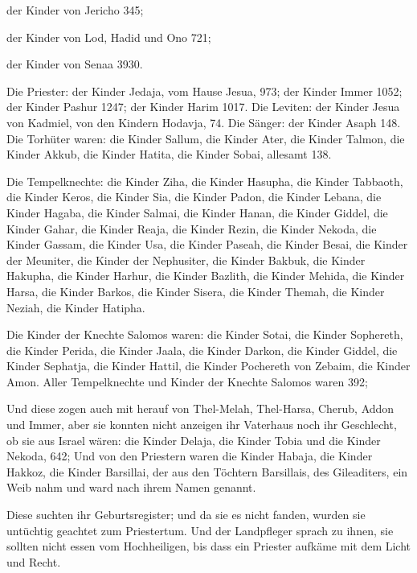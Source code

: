  der Kinder von Jericho 345;

 der Kinder von Lod, Hadid und Ono 721;

 der Kinder von Senaa 3930.

 Die Priester: der Kinder Jedaja, vom Hause Jesua, 973;
 der Kinder Immer 1052;  der Kinder Pashur
1247;  der Kinder Harim 1017.  Die
Leviten: der Kinder Jesua von Kadmiel, von den Kindern Hodavja, 74.
 Die Sänger: der Kinder Asaph 148.  Die
Torhüter waren: die Kinder Sallum, die Kinder Ater, die Kinder Talmon,
die Kinder Akkub, die Kinder Hatita, die Kinder Sobai, allesamt 138.

 Die Tempelknechte: die Kinder Ziha, die Kinder Hasupha,
die Kinder Tabbaoth,  die Kinder Keros, die Kinder Sia,
die Kinder Padon,  die Kinder Lebana, die Kinder Hagaba,
die Kinder Salmai,  die Kinder Hanan, die Kinder Giddel,
die Kinder Gahar,  die Kinder Reaja, die Kinder Rezin,
die Kinder Nekoda,  die Kinder Gassam, die Kinder Usa,
die Kinder Paseah,  die Kinder Besai, die Kinder der
Meuniter, die Kinder der Nephusiter,  die Kinder Bakbuk,
die Kinder Hakupha, die Kinder Harhur,  die Kinder
Bazlith, die Kinder Mehida, die Kinder Harsa,  die Kinder
Barkos, die Kinder Sisera, die Kinder Themah,  die Kinder
Neziah, die Kinder Hatipha.

 Die Kinder der Knechte Salomos waren: die Kinder Sotai,
die Kinder Sophereth, die Kinder Perida,  die Kinder
Jaala, die Kinder Darkon, die Kinder Giddel,  die Kinder
Sephatja, die Kinder Hattil, die Kinder Pochereth von Zebaim, die Kinder
Amon.  Aller Tempelknechte und Kinder der Knechte Salomos
waren 392;

 Und diese zogen auch mit herauf von Thel-Melah,
Thel-Harsa, Cherub, Addon und Immer, aber sie konnten nicht anzeigen ihr
Vaterhaus noch ihr Geschlecht, ob sie aus Israel wären: 
die Kinder Delaja, die Kinder Tobia und die Kinder Nekoda, 642;
 Und von den Priestern waren die Kinder Habaja, die
Kinder Hakkoz, die Kinder Barsillai, der aus den Töchtern Barsillais,
des Gileaditers, ein Weib nahm und ward nach ihrem Namen genannt.

 Diese suchten ihr Geburtsregister; und da sie es nicht
fanden, wurden sie untüchtig geachtet zum Priestertum. 
Und der Landpfleger sprach zu ihnen, sie sollten nicht essen vom
Hochheiligen, bis dass ein Priester aufkäme mit dem Licht und Recht.

